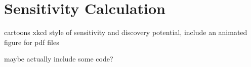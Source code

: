 \chapter{Sensitivity Calculation}

cartoons xkcd style of sensitivity and discovery potential, include an animated figure for pdf files

maybe actually include some code?